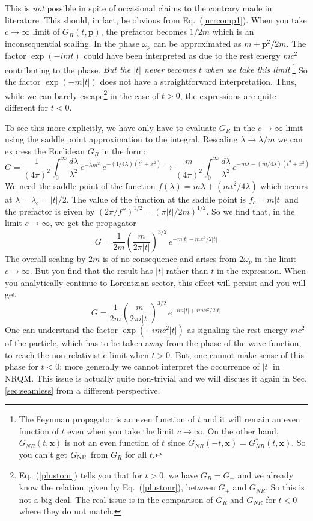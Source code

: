 \documentclass{article}
\def\eq#1{{Eq.~(\ref{#1})}}
\def\frab#1#2{\left(\frac{#1}{#2}\right)}
\begin{document}
This is \textit{not} possible in spite of occasional claims  to the contrary made in literature.
This should, in fact, be obvious from \eq{nrrcomp1}. When you take $c\to \infty $ limit of $G_R(t,\bm{p})$, the prefactor becomes $1/2m$ which is an inconsequential scaling.  In the phase $\omega_p$ can be approximated as $m+\bm{p}^2/2m$. The factor $\exp(-imt)$ could have been interpreted as due to the rest energy $mc^2$ contributing to the phase.
\textit{But the $|t|$ never becomes $t$ when we take this limit}.\footnote{The Feynman propagator is an even function of $t$  and it will remain an even function of $t$ even when you take the limit $c\to \infty$. On the other hand, $G_{NR}(t,\bm{x})$ is not an even function of $t$ since $G_{NR}(-t,\bm{x})= G_{NR}^*(t,\bm{x})$. So you can't get $G_{\rm NR}$ from $G_R$ for all $t$.}
So the factor $\exp(-m|t|)$ does not have a straightforward interpretation. Thus, while we can barely escape\footnote{\eq{plustonr} tells you that for $t>0$, we have $G_R=G_+$ and we already know the relation, given by \eq{plustonr},  between $G_+$ and $G_{NR}$. So this is not a big deal. The real issue is in the comparison of $G_R$ and $G_{NR}$ for $t<0$ where they do not match.}  in the case of $t>0$, the expressions are quite different for $t<0$. 

To see this more explicitly, we have only have to evaluate $G_R$ in the $c\to \infty$ limit using the saddle point approximation to the integral.
Rescaling $\lambda \to \lambda/m$ we can express the Euclidean $G_R$ in the form:
\begin{equation}
 G = \frac{1}{(4\pi)^2} \int_0^\infty \frac{d\lambda}{\lambda^2} \, e^{-\lambda m^2} \ e^{-(1/4\lambda) (t^2+x^2)}
 \to \frac{m}{(4\pi)^2} \int_0^\infty \frac{d\lambda}{\lambda^2} \, e^{-m\lambda - (m/4\lambda)(t^2+x^2)}
\end{equation}
We need the saddle point of the function $f(\lambda) = m\lambda + (mt^2/4\lambda)$ 
which occurs at $\lambda =\lambda_c= |t|/2$.
  The value of the function at the saddle point is $f_c = m|t|$
and the prefactor is given by $(2\pi/f'')^{1/2} = (\pi |t|/2m)^{1/2}$. 
  So we find that, in the limit $c\to \infty$, we get the propagator
\begin{equation}
 G = \frac{1}{2m}\frab{m}{2\pi |t|}^{3/2} \, e^{-m|t| - mx^2/2|t|}
\end{equation} 
The overall scaling by $2m$ is of no consequence and arises from  $2\omega_p$ in the limit $c\to \infty$. But you find  
 that the result has $|t|$ rather than $t$ in the expression. When you analytically continue to Lorentzian sector, this effect will persist and you will get
 \begin{equation}
 G = \frac{1}{2m}\frab{m}{2\pi i|t|}^{3/2} \, e^{-im|t| + imx^2/2|t|}
\end{equation} 
 One can understand the factor $\exp(-imc^2 |t|)$ as signaling the rest energy $mc^2$ of the particle, which has to be taken away from the phase of the wave function, to reach the non-relativistic limit when $t>0$. But, one cannot make sense of this phase for $t<0$; more generally we cannot interpret the occurrence of $|t|$ in NRQM. This issue is actually quite non-trivial and we will discuss it again in Sec.\ref{sec:seamless} from a different perspective. 
 
\end{document}
